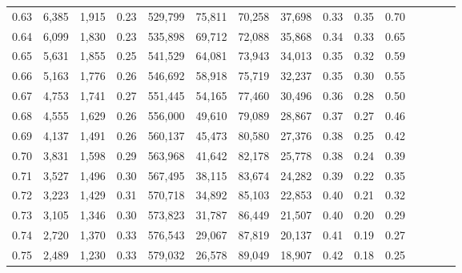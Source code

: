 \begin{tabular}{rrrcrrrrrrrrrrr}
0.63 &   6,385 &  1,915 &                                       0.23 &  529,799 &   75,811 &   70,258 &   37,698 &  0.33 &  0.35 &                         0.70 \\
0.64 &   6,099 &  1,830 &                                       0.23 &  535,898 &   69,712 &   72,088 &   35,868 &  0.34 &  0.33 &                         0.65 \\
0.65 &   5,631 &  1,855 &                                       0.25 &  541,529 &   64,081 &   73,943 &   34,013 &  0.35 &  0.32 &                         0.59 \\
0.66 &   5,163 &  1,776 &                                       0.26 &  546,692 &   58,918 &   75,719 &   32,237 &  0.35 &  0.30 &                         0.55 \\
0.67 &   4,753 &  1,741 &                                       0.27 &  551,445 &   54,165 &   77,460 &   30,496 &  0.36 &  0.28 &                         0.50 \\
0.68 &   4,555 &  1,629 &                                       0.26 &  556,000 &   49,610 &   79,089 &   28,867 &  0.37 &  0.27 &                         0.46 \\
0.69 &   4,137 &  1,491 &                                       0.26 &  560,137 &   45,473 &   80,580 &   27,376 &  0.38 &  0.25 &                         0.42 \\
0.70 &   3,831 &  1,598 &                                       0.29 &  563,968 &   41,642 &   82,178 &   25,778 &  0.38 &  0.24 &                         0.39 \\
0.71 &   3,527 &  1,496 &                                       0.30 &  567,495 &   38,115 &   83,674 &   24,282 &  0.39 &  0.22 &                         0.35 \\
0.72 &   3,223 &  1,429 &                                       0.31 &  570,718 &   34,892 &   85,103 &   22,853 &  0.40 &  0.21 &                         0.32 \\
0.73 &   3,105 &  1,346 &                                       0.30 &  573,823 &   31,787 &   86,449 &   21,507 &  0.40 &  0.20 &                         0.29 \\
0.74 &   2,720 &  1,370 &                                       0.33 &  576,543 &   29,067 &   87,819 &   20,137 &  0.41 &  0.19 &                         0.27 \\
0.75 &   2,489 &  1,230 &                                       0.33 &  579,032 &   26,578 &   89,049 &   18,907 &  0.42 &  0.18 &                         0.25 \\

\end{tabular}
